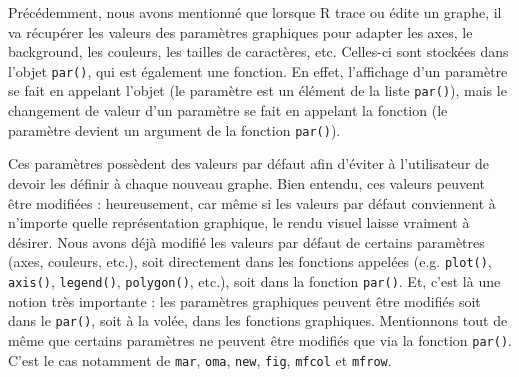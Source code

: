 \documentclass[]{article}
\newenvironment{Shaded}{\begin{snugshade}}{\end{snugshade}}
\newcommand{\CommentTok}[1]{\textcolor[rgb]{0.56,0.35,0.01}{\textit{#1}}}
\newcommand{\KeywordTok}[1]{\textcolor[rgb]{0.13,0.29,0.53}{\textbf{#1}}}
\newcommand{\NormalTok}[1]{#1}
\newcommand{\OperatorTok}[1]{\textcolor[rgb]{0.81,0.36,0.00}{\textbf{#1}}}
\begin{document}
Précédemment, nous avons mentionné que lorsque R trace ou édite un graphe, il va récupérer les valeurs des paramètres graphiques pour adapter les axes, le background, les couleurs, les tailles de caractères, etc. Celles-ci sont stockées dans l'objet \texttt{par()}, qui est également une fonction. En effet, l'affichage d'un paramètre se fait en appelant l'objet (le paramètre est un élément de la liste \texttt{par()}), mais le changement de valeur d'un paramètre se fait en appelant la fonction (le paramètre devient un argument de la fonction \texttt{par()}).

\begin{Shaded}
\end{Shaded}

Ces paramètres possèdent des valeurs par défaut afin d'éviter à l'utilisateur de devoir les définir à chaque nouveau graphe. Bien entendu, ces valeurs peuvent être modifiées : heureusement, car même si les valeurs par défaut conviennent à n'importe quelle représentation graphique, le rendu visuel laisse vraiment à désirer. Nous avons déjà modifié les valeurs par défaut de certains paramètres (axes, couleurs, etc.), soit directement dans les fonctions appelées (e.g. \texttt{plot()}, \texttt{axis()}, \texttt{legend()}, \texttt{polygon()}, etc.), soit dans la fonction \texttt{par()}.
Et, c'est là une notion très importante : les paramètres graphiques peuvent être modifiés soit dans le \texttt{par()}, soit à la volée, dans les fonctions graphiques. Mentionnons tout de même que certains paramètres ne peuvent être modifiés que via la fonction \texttt{par()}. C'est le cas notamment de \texttt{mar}, \texttt{oma}, \texttt{new}, \texttt{fig}, \texttt{mfcol} et \texttt{mfrow}.
\end{document}
